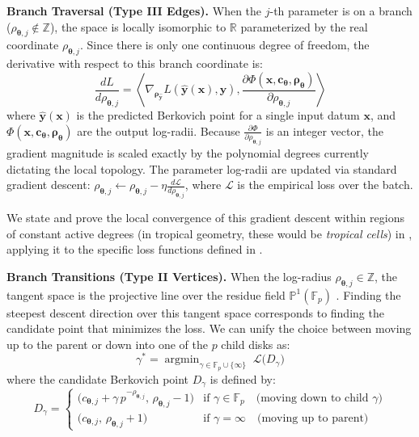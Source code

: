 \textbf{Branch Traversal (Type III Edges).} When the $j$-th parameter is on a branch ($\rho_{\boldsymbol{\theta}, j} \notin \mathbb{Z}$), the space is locally isomorphic to $\mathbb{R}$ parameterized by the real coordinate $\rho_{\boldsymbol{\theta}, j}$. Since there is only one continuous degree of freedom, the derivative with respect to this branch coordinate is:
\begin{equation}
\label{eq:continuous_gradient_flow}
    \frac{d L}{d \rho_{\boldsymbol{\theta}, j}} = \left\langle \nabla_{\boldsymbol{\rho}_{\hat{\mathbf{y}}}} L(\hat{\mathbf{y}}(\mathbf{x}), \mathbf{y}), \frac{\partial \Phi(\mathbf{x}, \mathbf{c}_{\boldsymbol{\theta}}, \boldsymbol{\rho}_{\boldsymbol{\theta}})}{\partial \rho_{\boldsymbol{\theta}, j}} \right\rangle
\end{equation}
where $\hat{\mathbf{y}}(\mathbf{x})$ is the predicted Berkovich point for a single input datum $\mathbf{x}$, and $\Phi(\mathbf{x}, \mathbf{c}_{\boldsymbol{\theta}}, \boldsymbol{\rho}_{\boldsymbol{\theta}})$ are the output log-radii. Because $\frac{\partial \Phi}{\partial \rho_{\boldsymbol{\theta}, j}}$ is an integer vector, the gradient magnitude is scaled exactly by the polynomial degrees currently dictating the local topology. The parameter log-radii are updated via standard gradient descent: $\rho_{\boldsymbol{\theta}, j} \leftarrow \rho_{\boldsymbol{\theta}, j} - \eta \frac{d \mathcal{L}}{d \rho_{\boldsymbol{\theta}, j}}$, where $\mathcal{L}$ is the empirical loss over the batch.

We state and prove the local convergence of this gradient descent within regions of constant active degrees (in tropical geometry, these would be \textit{tropical cells}) in , applying it to the specific loss functions defined in .

\textbf{Branch Transitions (Type II Vertices).} When the log-radius $\rho_{\boldsymbol{\theta}, j} \in \mathbb{Z}$, the tangent space is the projective line over the residue field $\mathbb{P}^1(\mathbb{F}_p)$ \citep{baker2010potential}. Finding the steepest descent direction over this tangent space corresponds to finding the candidate point that minimizes the loss. We can unify the choice between moving up to the parent or down into one of the $p$ child disks as:
\begin{equation}
\label{eq:exact_branch_unified}
    \gamma^* = \operatorname{argmin}_{\gamma \in \mathbb{F}_p \cup \{\infty\}}\; \mathcal{L}\bigl(D_\gamma\bigr)
\end{equation}
where the candidate Berkovich point $D_\gamma$ is defined by:
\begin{equation}
D_\gamma = \begin{cases} 
\bigl(c_{\boldsymbol{\theta}, j} + \gamma \, p^{-\rho_{\boldsymbol{\theta}, j}},\, \rho_{\boldsymbol{\theta}, j} - 1\bigr) & \text{if } \gamma \in \mathbb{F}_p \quad \text{(moving down to child } \gamma\text{)} \\
\bigl(c_{\boldsymbol{\theta}, j},\, \rho_{\boldsymbol{\theta}, j} + 1\bigr) & \text{if } \gamma = \infty \quad \text{(moving up to parent)}
\end{cases}
\end{equation}

